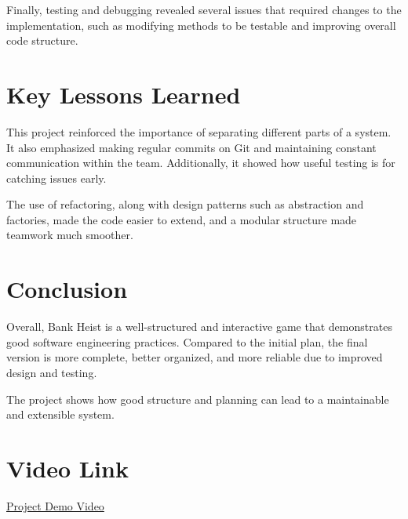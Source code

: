 \documentclass[11pt]{article}
\begin{document}
Finally, testing and debugging revealed several issues that required changes to the implementation, such as modifying methods to be testable and improving overall code structure.

\section{Key Lessons Learned}

This project reinforced the importance of separating different parts of a system. It also emphasized making regular commits on Git and maintaining constant communication within the team. Additionally, it showed how useful testing is for catching issues early.

The use of refactoring, along with design patterns such as abstraction and factories, made the code easier to extend, and a modular structure made teamwork much smoother.

\section{Conclusion}

Overall, Bank Heist is a well-structured and interactive game that demonstrates good software engineering practices. Compared to the initial plan, the final version is more complete, better organized, and more reliable due to improved design and testing.

The project shows how good structure and planning can lead to a maintainable and extensible system.

\section*{Video Link}

\noindent \href{https://youtu.be/ZiidlGFFCcc}{Project Demo Video}
\end{document}
